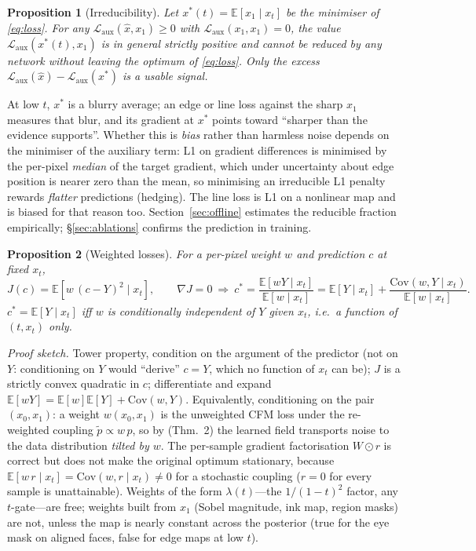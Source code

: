 \documentclass[11pt]{article}
\newcommand{\E}{\mathbb{E}}
\newcommand{\xh}{\hat{x}}
\newtheorem{proposition}{Proposition}
\begin{document}
\begin{proposition}[Irreducibility]
Let $x^*(t)=\E[x_1\mid x_t]$ be the minimiser of \eqref{eq:loss}. For any
$\mathcal L_{\text{aux}}(\xh,x_1)\ge0$ with $\mathcal L_{\text{aux}}(x_1,x_1)=0$, the
value $\mathcal L_{\text{aux}}(x^*(t),x_1)$ is in general strictly positive and cannot
be reduced by any network without leaving the optimum of \eqref{eq:loss}. Only the
excess $\mathcal L_{\text{aux}}(\xh)-\mathcal L_{\text{aux}}(x^*)$ is a usable signal.
\end{proposition}

At low $t$, $x^*$ is a blurry average; an edge or line loss against the sharp $x_1$
measures that blur, and its gradient at $x^*$ points toward ``sharper than the evidence
supports''. Whether this is \emph{bias} rather than harmless noise depends on the
minimiser of the auxiliary term: L1 on gradient differences is minimised by the
per-pixel \emph{median} of the target gradient, which under uncertainty about edge
position is nearer zero than the mean, so minimising an irreducible L1 penalty rewards
\emph{flatter} predictions (hedging). The line loss is L1 on a nonlinear map and is
biased for that reason too. Section~\ref{sec:offline} estimates the reducible fraction
empirically; \S\ref{sec:ablations} confirms the prediction in training.

\begin{proposition}[Weighted losses]\label{prop:weight}
For a per-pixel weight $w$ and prediction $c$ at fixed $x_t$,
\[
J(c)=\E[w\,(c-Y)^2\mid x_t],\qquad \nabla J=0\ \Rightarrow\
c^*=\frac{\E[wY\mid x_t]}{\E[w\mid x_t]}=\E[Y\mid x_t]+\frac{\mathrm{Cov}(w,Y\mid x_t)}{\E[w\mid x_t]} .
\]
$c^*=\E[Y\mid x_t]$ iff $w$ is conditionally independent of $Y$ given $x_t$, i.e.\ a
function of $(t,x_t)$ only.
\end{proposition}

\emph{Proof sketch.} Tower property, condition on the argument of the predictor (not on
$Y$: conditioning on $Y$ would ``derive'' $c=Y$, which no function of $x_t$ can be);
$J$ is a strictly convex quadratic in $c$; differentiate and expand
$\E[wY]=\E[w]\E[Y]+\mathrm{Cov}(w,Y)$. Equivalently, conditioning on the pair
$(x_0,x_1)$: a weight $w(x_0,x_1)$ is the unweighted CFM loss under the re-weighted
coupling $\tilde p\propto w\,p$, so by \citet{lipman2023fm} (Thm.~2) the learned field
transports noise to the data distribution \emph{tilted by $w$}. The per-sample gradient
factorisation $W\odot r$ is correct but does not make the original optimum stationary,
because $\E[w\,r\mid x_t]=\mathrm{Cov}(w,r\mid x_t)\neq0$ for a stochastic coupling
($r=0$ for every sample is unattainable). Weights of the form $\lambda(t)$---the
$1/(1-t)^2$ factor, any $t$-gate---are free; weights built from $x_1$ (Sobel magnitude,
ink map, region masks) are not, unless the map is nearly constant across the posterior
(true for the eye mask on aligned faces, false for edge maps at low $t$).
\end{document}

